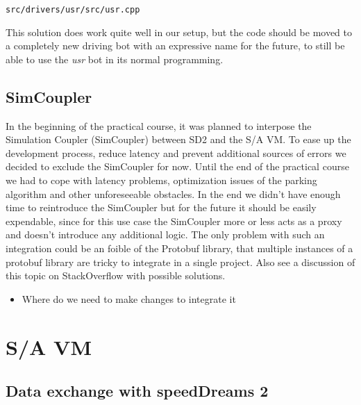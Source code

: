 \documentclass[paper=a4, fontsize=11pt]{scrreprt}
\begin{document}
\begin{listing}[ht]
  \inputminted[firstline=751,linenos=true,lastline=755,gobble=4]{c++}{../../../simulators/speed-dreams/src/drivers/usr/src/usr.cpp}
  \caption{\texttt{src/drivers/usr/src/usr.cpp}}\label{aw_parked}
\end{listing}

This solution does work quite well in our setup,
but the code should be moved to a completely new driving bot with an expressive name for the future,
to still be able to use the \textit{usr} bot in its normal programming.

\section{SimCoupler}
In the beginning of the practical course,
it was planned to interpose the Simulation Coupler (SimCoupler) between SD2 and the S/A VM.
To ease up the development process, reduce latency and
prevent additional sources of errors we decided to exclude the SimCoupler for now.
Until the end of the practical course we had to cope with latency problems,
optimization issues of the parking algorithm and other unforeseeable obstacles.
In the end we didn't have enough time to reintroduce the SimCoupler
but for the future it should be easily expendable,
since for this use case the SimCoupler more or less acts as a proxy
and doesn't introduce any additional logic.
The only problem with such an integration could be an foible of the Protobuf library,
that multiple instances of a protobuf library are tricky to integrate in a single project.
Also see a discussion of this topic on StackOverflow \cite{soprotobuf} with possible solutions.
\begin{itemize}
  \item Where do we need to make changes to integrate it
\end{itemize}
\newpage
\chapter{S/A VM}
\section{Data exchange with speedDreams 2}
\end{document}
